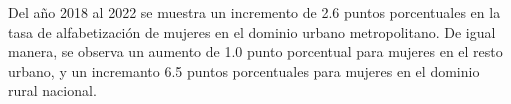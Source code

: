 Del año 2018 al 2022 se muestra un incremento de 2.6 puntos porcentuales en la tasa de alfabetización de mujeres en el dominio urbano metropolitano. De igual manera, se observa un aumento de 1.0 punto porcentual para mujeres en el resto urbano, y un incremanto 6.5 puntos porcentuales para mujeres en el dominio rural nacional. 